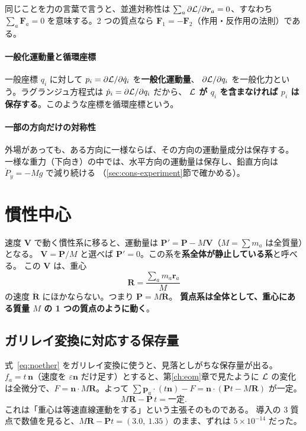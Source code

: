 同じことを力の言葉で言うと、並進対称性は $\sum_a\partial\mathcal{L}/\partial\bm r_a=0$、すなわち
$\sum_a\bm F_a=0$ を意味する。2 つの質点なら $\bm F_1=-\bm F_2$（作用・反作用の法則）である。

\paragraph{一般化運動量と循環座標}
一般座標 $q_i$ に対して $p_i=\partial\mathcal{L}/\partial\dot q_i$ を\textbf{一般化運動量}、
$\partial\mathcal{L}/\partial q_i$ を一般化力という。ラグランジュ方程式は $\dot p_i=\partial\mathcal{L}/\partial q_i$ だから、
\textbf{$\mathcal{L}$ が $q_i$ を含まなければ $p_i$ は保存する}。このような座標を循環座標という。

\paragraph{一部の方向だけの対称性}
外場があっても、ある方向に一様ならば、その方向の運動量成分は保存する。
一様な重力（下向き）の中では、水平方向の運動量は保存し、鉛直方向は $\dot P_y=-Mg$ で減り続ける
（\ref{sec:cons-experiment}節で確かめる）。

\section{慣性中心}\label{sec:cons-center}

速度 $\bm V$ で動く慣性系に移ると、運動量は $\bm P'=\bm P-M\bm V$（$M=\sum m_a$ は全質量）となる。
$\bm V=\bm P/M$ と選べば $\bm P'=0$。この系を\textbf{系全体が静止している系}と呼べる。
この $\bm V$ は、重心
\begin{equation}
  \bm R=\frac{\sum_am_a\bm r_a}{M}
\end{equation}
の速度 $\dot{\bm R}$ にほかならない。つまり $\bm P=M\dot{\bm R}$。
\textbf{質点系は全体として、重心にある質量 $M$ の 1 つの質点のように動く}。

\subsection*{ガリレイ変換に対応する保存量}

式~\eqref{eq:noether} をガリレイ変換に使うと、見落としがちな保存量が出る。
$f_a=t\,\bm n$（速度を $\varepsilon\bm n$ だけ足す）とすると、第\ref{ch:eom}章で見たように
$\mathcal{L}$ の変化は全微分で、$F=\bm n\cdot M\bm R$。よって $\sum\bm p_a\cdot(t\bm n)-F=\bm n\cdot(\bm Pt-M\bm R)$ が一定。
\begin{equation}
  M\bm R-\bm P\,t=\text{一定}.
  \label{eq:com-theorem}
\end{equation}
これは「重心は等速直線運動をする」という主張そのものである。
導入の 3 質点で数値を見ると、$M\bm R-\bm Pt=(3.0,\ 1.35)$ のまま、ずれは $5\times10^{-14}$ だった。

